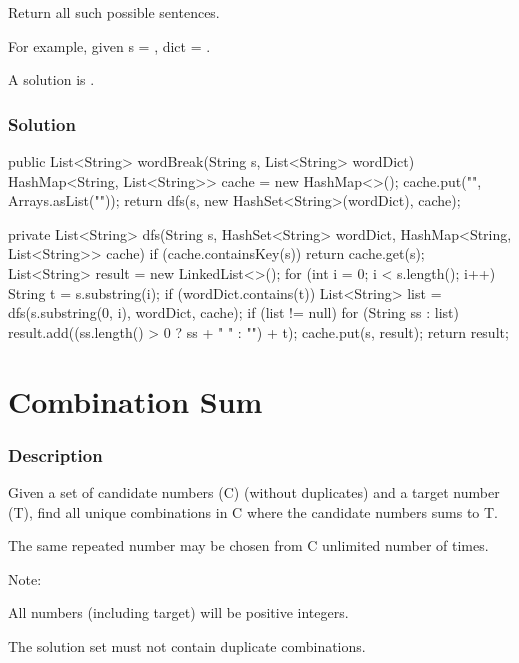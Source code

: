 Return all such possible sentences.

For example, given
s = ,
dict = .

A solution is .

\subsubsection{Solution}

\begin{Code}
public List<String> wordBreak(String s, List<String> wordDict) {
    HashMap<String, List<String>> cache = new HashMap<>();
    cache.put("", Arrays.asList(""));
    return dfs(s, new HashSet<String>(wordDict), cache);
}

private List<String> dfs(String s, HashSet<String> wordDict, HashMap<String, List<String>> cache) {
    if (cache.containsKey(s)) {
        return cache.get(s);
    }
    List<String> result = new LinkedList<>();
    for (int i = 0; i < s.length(); i++) {
        String t = s.substring(i);
        if (wordDict.contains(t)) {
            List<String> list = dfs(s.substring(0, i), wordDict, cache);
            if (list != null) {
                for (String ss : list) {
                    result.add((ss.length() > 0 ? ss + " " : "") + t);
                }
            }
        }
    }
    cache.put(s, result);
    return result;
}
\end{Code}

\newpage

\section{Combination Sum} %

\subsubsection{Description}

Given a set of candidate numbers (C) (without duplicates) and a target number (T), find all unique combinations in C where the candidate numbers sums to T.

The same repeated number may be chosen from C unlimited number of times.

Note:

All numbers (including target) will be positive integers.

The solution set must not contain duplicate combinations.

